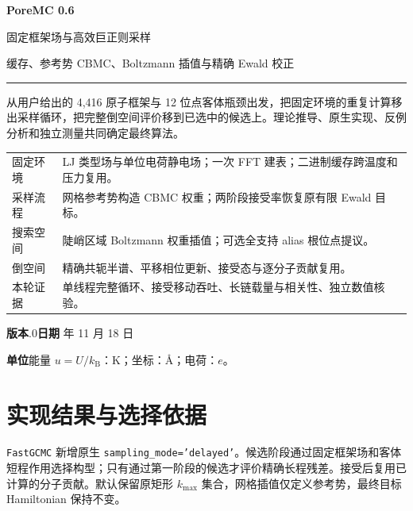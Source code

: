 \documentclass[11pt,a4paper]{article}
\newcommand{\code}[1]{\texttt{\small #1}}
\begin{document}
\begin{titlepage}
\vspace*{18mm}
{\latinfont\fontsize{44}{50}\selectfont\color{navy}\bfseries PoreMC 0.6\par}
\vspace{12mm}
{\fontsize{25}{35}\selectfont 固定框架场与高效巨正则采样\par}
\vspace{5mm}
{\Large 缓存、参考势 CBMC、Boltzmann 插值与精确 Ewald 校正\par}
\vspace{12mm}
\noindent\color{navy}\rule{\textwidth}{1.1pt}\color{black}
\vspace{8mm}
\noindent 从用户给出的 4,416 原子框架与 12 位点客体瓶颈出发，把固定环境的重复计算移出采样循环，把完整倒空间评价移到已选中的候选上。理论推导、原生实现、反例分析和独立测量共同确定最终算法。\par
\vspace{10mm}
\begin{tabular}{@{}p{31mm}p{118mm}@{}}\toprule
固定环境 & LJ 类型场与单位电荷静电场；一次 FFT 建表；二进制缓存跨温度和压力复用。\\[5pt]
采样流程 & 网格参考势构造 CBMC 权重；两阶段接受率恢复原有限 Ewald 目标。\\[5pt]
搜索空间 & 陡峭区域 Boltzmann 权重插值；可选全支持 alias 根位点提议。\\[5pt]
倒空间 & 精确共轭半谱、平移相位更新、接受态与逐分子贡献复用。\\[5pt]
本轮证据 & 单线程完整循环、接受移动吞吐、长链载量与相关性、独立数值核验。\\\bottomrule
\end{tabular}
\vfill
\noindent\textbf{版本}.0\qquad\textbf{日期} 年 11 月 18 日\par
\noindent\textbf{单位}\quad 能量 $u=U/k_{\mathrm B}$：K；坐标：\AA；电荷：$e$。\par
\end{titlepage}

\section*{实现结果与选择依据}
\code{FastGCMC} 新增原生 \code{sampling\_mode='delayed'}。候选阶段通过固定框架场和客体短程作用选择构型；只有通过第一阶段的候选才评价精确长程残差。接受后复用已计算的分子贡献。默认保留原矩形 $k_{\max}$ 集合，网格插值仅定义参考势，最终目标 Hamiltonian 保持不变。
\end{document}
